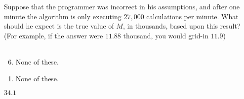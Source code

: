  
Suppose that the programmer was incorrect in his assumptions, and after one minute the algorithm is only executing $27,000$ calculations per minute.  What should he expect is the true value of $M$, in thousands, based upon this result? (For example, if the answer were $11.88$ thousand, you would grid-in $11.9$)\\ \\


\ifsat
	\begin{enumerate}[label=\Alph*)]
	\end{enumerate}
\else
\fi

\ifacteven
	\begin{enumerate}[label=\textbf{\Alph*.},itemsep=\fill,align=left]
		\setcounter{enumii}{5}
		\item None of these. 
	\end{enumerate}
\else
\fi

\ifactodd
	\begin{enumerate}[label=\textbf{\Alph*.},itemsep=\fill,align=left]
		\item None of these. 
	\end{enumerate}
\else
\fi

\ifgridin
$34.1$
\else
\fi


